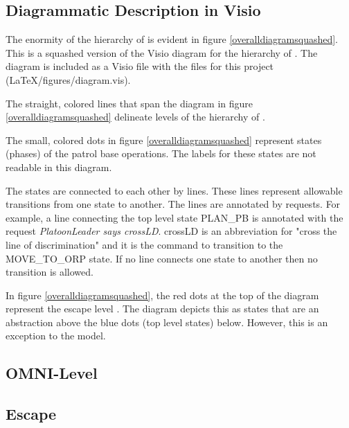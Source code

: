\documentclass[../../main/main.tex]{subfiles}
\begin{document}
\subsection{Diagrammatic Description in Visio}\label{ssec:overalldiagram}
The enormity of the hierarchy of  is evident in figure \ref{overalldiagramsquashed}.  This is a squashed version of the Visio diagram for the hierarchy of .  The diagram is included as a Visio file with the files for this project (LaTeX/figures/diagram.vis).  

The straight, colored lines that span the diagram in figure \ref{overalldiagramsquashed} delineate levels of the hierarchy of .  

The small, colored dots in figure \ref{overalldiagramsquashed} represent states (phases) of the patrol base operations.  The labels for these states are not readable in this diagram.  

The states are connected to each other by lines.  These lines represent allowable transitions from one state to another.  The lines are annotated by  requests.  For example, a line connecting the top level state PLAN_PB is annotated with the request \textit{PlatoonLeader says crossLD}.  crossLD is an abbreviation for "cross the line of discrimination" and it is the command to transition to the MOVE_TO_ORP state.  If no line connects one state to another then no transition is allowed.

In figure \ref{overalldiagramsquashed}, the red dots at the top of the diagram represent the escape level .  The diagram depicts this  as states that are an abstraction above the blue dots (top level states) below.  However, this  is an exception to the model.  


 

\subsection{OMNI-Level}\label{ssec:omnilevel}

\subsection{Escape}\label{ssec:escape}
\end{document}
